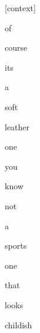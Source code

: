 \documentclass[varwidth]{standalone}
\begin{document}
\begin{CJK*}{UTF8}{gbsn}
{\setlength{\fboxsep}{0pt}\colorbox{white!0}{\parbox{0.9\textwidth}{
\colorbox{red!0.022511504590511322}{\strut [context]} \colorbox{red!0.01132400706410408}{\strut of} \colorbox{red!0.38047587871551514}{\strut course} \colorbox{red!0.09959915280342102}{\strut its} \colorbox{red!0.10603978484869003}{\strut a} \colorbox{red!2.898043632507324}{\strut soft} \colorbox{red!0.9047800898551941}{\strut leather} \colorbox{red!2.985417127609253}{\strut one} \colorbox{red!0.2092624306678772}{\strut you} \colorbox{red!1.4120802879333496}{\strut know} \colorbox{red!0.6837462186813354}{\strut not} \colorbox{red!1.4973794221878052}{\strut a} \colorbox{red!0.5694486498832703}{\strut sports} \colorbox{red!2.009909152984619}{\strut one} \colorbox{red!2.576047897338867}{\strut that} \colorbox{red!1.2940973043441772}{\strut looks} \colorbox{red!82.33985137939453}{\strut childish} 
}}}
\end{CJK*}
\end{document}
